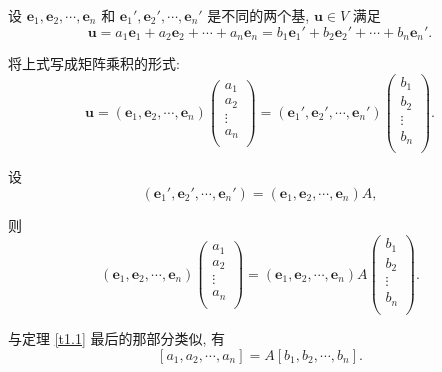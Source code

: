 \documentclass[color=black,device=normal,lang=cn,mode=geye]{elegantnote}
\begin{document}
设 $\boldsymbol{e}_1,\boldsymbol{e}_2,\cdots,\boldsymbol{e}_n$ 和 $\boldsymbol{e}_1',\boldsymbol{e}_2',\cdots,\boldsymbol{e}_n'$ 是不同的两个基, $\boldsymbol{u}\in V$ 满足
\[\boldsymbol{u}=a_1\boldsymbol{e}_1+a_2\boldsymbol{e}_2+\cdots+a_n\boldsymbol{e}_n=b_1\boldsymbol{e}_1'+b_2\boldsymbol{e}_2'+\cdots+b_n\boldsymbol{e}_n'.\]

将上式写成矩阵乘积的形式:
\[\boldsymbol{u}=(\boldsymbol{e}_1,\boldsymbol{e}_2,\cdots,\boldsymbol{e}_n)\begin{pmatrix}
    a_1 \\
    a_2 \\
    \vdots \\
    a_n \\
\end{pmatrix}=(\boldsymbol{e}_1',\boldsymbol{e}_2',\cdots,\boldsymbol{e}_n')\begin{pmatrix}
    b_1 \\
    b_2 \\
    \vdots \\
    b_n \\
\end{pmatrix}.\]

设
\[(\boldsymbol{e}_1',\boldsymbol{e}_2',\cdots,\boldsymbol{e}_n')=(\boldsymbol{e}_1,\boldsymbol{e}_2,\cdots,\boldsymbol{e}_n)A,\]

则
\[(\boldsymbol{e}_1,\boldsymbol{e}_2,\cdots,\boldsymbol{e}_n)\begin{pmatrix}
    a_1 \\
    a_2 \\
    \vdots \\
    a_n \\
\end{pmatrix}=(\boldsymbol{e}_1,\boldsymbol{e}_2,\cdots,\boldsymbol{e}_n)A\begin{pmatrix}
    b_1 \\
    b_2 \\
    \vdots \\
    b_n \\
\end{pmatrix}.\]

与定理 \ref{t1.1} 最后的那部分类似, 有
\[[a_1,a_2,\cdots,a_n]=A[b_1,b_2,\cdots,b_n].\]
\end{document}
